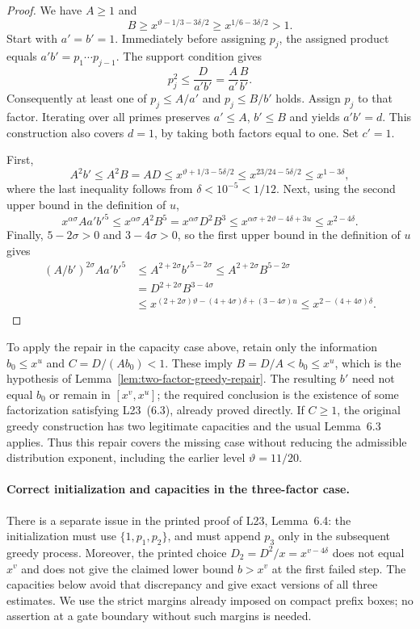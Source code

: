 \begin{proof}
We have $A\ge1$ and
\[
 B\ge x^{\vartheta-1/3-3\delta/2}
       \ge x^{1/6-3\delta/2}>1.
\]
Start with $a'=b'=1$.  Immediately before assigning $p_j$, the
assigned product equals $a'b'=p_1\cdots p_{j-1}$.  The support
condition gives
\[
 p_j^2\le\frac{D}{a'b'}=\frac{A}{a'}\frac{B}{b'}.
\]
Consequently at least one of $p_j\le A/a'$ and $p_j\le B/b'$
holds.  Assign $p_j$ to that factor.  Iterating over all primes
preserves $a'\le A$, $b'\le B$ and yields $a'b'=d$.
This construction also covers $d=1$, by taking both factors equal
to one.  Set $c'=1$.

First,
\[
 A^2b'\le A^2B=AD
 \le x^{\vartheta+1/3-5\delta/2}
 \le x^{23/24-5\delta/2}
 \le x^{1-3\delta},
\]
where the last inequality follows from $\delta<10^{-5}<1/12$.
Next, using the second upper bound in the definition of $u$,
\[
 x^{\alpha\sigma}Aa'b'^5
 \le x^{\alpha\sigma}A^2B^5
 =x^{\alpha\sigma}D^2B^3
 \le x^{\alpha\sigma+2\vartheta-4\delta+3u}
 \le x^{2-4\delta}.
\]
Finally, $5-2\sigma>0$ and $3-4\sigma>0$, so the first upper
bound in the definition of $u$ gives
\begin{align*}
 (A/b')^{2\sigma}Aa'b'^5
 &\le A^{2+2\sigma}b'^{5-2\sigma}
 \le A^{2+2\sigma}B^{5-2\sigma}\\
 &=D^{2+2\sigma}B^{3-4\sigma}\\
 &\le x^{(2+2\sigma)\vartheta-(4+4\sigma)\delta
                         +(3-4\sigma)u}
 \le x^{2-(4+4\sigma)\delta}.
\end{align*}
\end{proof}

To apply the repair in the capacity case above, retain only the
information $b_0\le x^u$ and $C=D/(A b_0)<1$.  These imply
$B=D/A<b_0\le x^u$, which is the hypothesis of
Lemma~\ref{lem:two-factor-greedy-repair}.  The resulting $b'$ need
not equal $b_0$ or remain in $[x^v,x^u]$; the required conclusion is
the existence of some factorization satisfying L23~(6.3), already
proved directly.  If $C\ge1$, the original greedy construction
has two legitimate capacities and the usual Lemma~6.3 applies.
Thus this repair covers the missing case without reducing the
admissible distribution exponent, including the earlier level
$\vartheta=11/20$.

\paragraph{Correct initialization and capacities in the three-factor case.}
There is a separate issue in the printed proof of L23, Lemma~6.4:
the initialization must use $\{1,p_1,p_2\}$, and must append $p_3$
only in the subsequent greedy process.  Moreover, the printed
choice $D_2=D^2/x=x^{v-4\delta}$ does not equal $x^v$ and does not
give the claimed lower bound $b>x^v$ at the first failed step.
The capacities below avoid that discrepancy and give exact
versions of all three estimates.  We use the strict margins
already imposed on compact prefix boxes; no assertion at a gate
boundary without such margins is needed.

